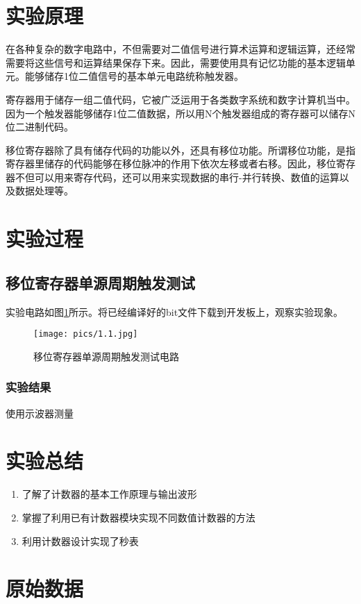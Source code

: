 \documentclass[UTF8]{ctexart}
\numberwithin{figure}{subsection}
\numberwithin{table}{subsection}
\numberwithin{equation}{subsection}
\begin{document}
\section{实验原理}
\par 在各种复杂的数字电路中，不但需要对二值信号进行算术运算和逻辑运算，还经常需要将这些信号和运算结果保存下来。因此，需要使用具有记忆功能的基本逻辑单元。能够储存1位二值信号的基本单元电路统称触发器。
\par 寄存器用于储存一组二值代码，它被广泛运用于各类数字系统和数字计算机当中。因为一个触发器能够储存1位二值数据，所以用N个触发器组成的寄存器可以储存N位二进制代码。
\par 移位寄存器除了具有储存代码的功能以外，还具有移位功能。所谓移位功能，是指寄存器里储存的代码能够在移位脉冲的作用下依次左移或者右移。因此，移位寄存器不但可以用来寄存代码，还可以用来实现数据的串行-并行转换、数值的运算以及数据处理等。

\section{实验过程}
\subsection{移位寄存器单源周期触发测试}
\par 实验电路如图\ref{single source citcuit}所示。将已经编译好的bit文件下载到开发板上，观察实验现象。

\begin{figure}[H]
    \begin{center}
        \texttt{[image: pics/1.1.jpg]}
    \end{center}
    \caption{移位寄存器单源周期触发测试电路}
    \label{single source citcuit}
\end{figure}

\subsubsection{实验结果}
使用示波器测量

\section{实验总结}
\begin{enumerate}
    \item 了解了计数器的基本工作原理与输出波形
    \item 掌握了利用已有计数器模块实现不同数值计数器的方法
    \item 利用计数器设计实现了秒表
\end{enumerate}

\section*{原始数据}
\end{document}
